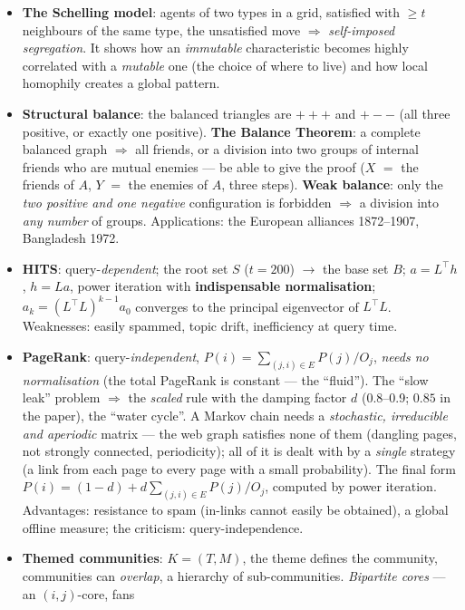 \documentclass[11pt,a4paper]{article}
\theoremstyle{definition}
\providecommand{\uv}[1]{``#1''}
\begin{document}
\begin{itemize}
      \emph{diminishing returns}.
\item \textbf{The Schelling model}: agents of two types in a grid, satisfied with $\ge t$ neighbours of
      the same type, the unsatisfied move $\Rightarrow$ \emph{self-imposed segregation}. It shows how an
      \emph{immutable} characteristic becomes highly correlated with a \emph{mutable} one (the choice of
      where to live) and how local homophily creates a global pattern.
\item \textbf{Structural balance}: the balanced triangles are $+{+}{+}$ and $+{-}{-}$ (all three
      positive, or exactly one positive). \textbf{The Balance Theorem}: a complete balanced graph
      $\Rightarrow$ all friends, or a division into two groups of internal friends who are mutual
      enemies --- be able to give the proof ($X$ $=$ the friends of $A$, $Y$ $=$ the enemies of $A$,
      three steps). \textbf{Weak balance}: only the \emph{two positive and one negative} configuration
      is forbidden $\Rightarrow$ a division into \emph{any number} of groups. Applications: the European
      alliances 1872--1907, Bangladesh 1972.
\item \textbf{HITS}: query-\emph{dependent}; the root set $S$ ($t=200$) $\to$ the base set $B$;
      $a=L^{\!\top}h$, $h=La$, power iteration with \textbf{indispensable normalisation};
      $a_k=(L^{\!\top}L)^{k-1}a_0$ converges to the principal eigenvector of $L^{\!\top}L$.
      Weaknesses: easily spammed, topic drift, inefficiency at query time.
\item \textbf{PageRank}: query-\emph{independent}, $P(i)=\sum_{(j,i)\in E}P(j)/O_j$, \emph{needs no
      normalisation} (the total PageRank is constant --- the \uv{fluid}). The \uv{slow leak} problem
      $\Rightarrow$ the \emph{scaled} rule with the damping factor $d$ (0.8--0.9; $0.85$ in the paper),
      the \uv{water cycle}. A Markov chain needs a \emph{stochastic, irreducible and aperiodic} matrix
      --- the web graph satisfies none of them (dangling pages, not strongly connected, periodicity);
      all of it is dealt with by a \emph{single} strategy (a link from each page to every page with a
      small probability). The final form $P(i)=(1-d)+d\sum_{(j,i)\in E}P(j)/O_j$, computed by power
      iteration. Advantages: resistance to spam (in-links cannot easily be obtained), a global offline
      measure; the criticism: query-independence.
\item \textbf{Themed communities}: $K=(T,M)$, the theme defines the community, communities can
      \emph{overlap}, a hierarchy of sub-communities. \emph{Bipartite cores} --- an $(i,j)$-core, fans

\end{itemize}
\end{document}
